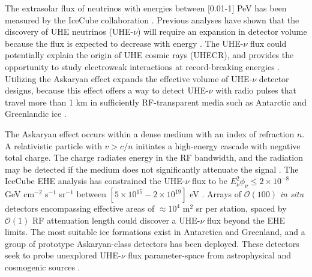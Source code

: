 \documentclass[amsmath,amssymb,aps,prd,10pt,twocolumn]{revtex4}
\begin{document}
The extrasolar flux of neutrinos with energies between [0.01-1] PeV has been measured by the IceCube collaboration \cite{10.1126/science.1242856}.  Previous analyses have shown that the discovery of UHE neutrinos (UHE-$\nu$) will require an expansion in detector volume because the flux is expected to decrease with energy \cite{10.1016/j.astropartphys.2010.06.003,10.1088/1475-7516/2010/10/013,10.1103/physrevd.98.062003,10.1088/1475-7516/2020/03/053,10.1103/physrevd.102.043021}.  The UHE-$\nu$ flux could potentially explain the origin of UHE cosmic rays (UHECR), and provides the opportunity to study electroweak interactions at record-breaking energies \cite{Ackermann:201946d,Ackermann:20195ec}.  Utilizing the Askaryan effect expands the effective volume of UHE-$\nu$ detector designs, because this effect offers a way to detect UHE-$\nu$ with radio pulses that travel more than 1 km in sufficiently RF-transparent media such as Antarctic and Greenlandic ice \cite{10.3189/2015jog14j214, 10.3189/2015jog15j057, 10.1016/j.astropartphys.2011.11.010}.

The Askaryan effect occurs within a dense medium with an index of refraction $n$.  A relativistic particle with $v > c/n$ initiates a high-energy cascade with negative total charge.  The charge radiates energy in the RF bandwidth, and the radiation may be detected if the medium does not significantly attenuate the signal \cite{askaryan1,zhs}.  The IceCube EHE analysis has constrained the UHE-$\nu$ flux to be $E_\nu^2 \phi_\nu \leq 2 \times 10^{-8}$ GeV cm$^{-2}$ s$^{-1}$ sr$^{-1}$ between $[5\times 10^{15} - 2\times 10^{19}]$ eV \cite{10.1103/physrevd.98.062003}.  Arrays of $\mathcal{O}(100)$ \textit{in situ} detectors encompassing effective areas of $\approx 10^4$ m$^2$ sr per station, spaced by $\mathcal{O}(1)$ RF attenuation length could discover a UHE-$\nu$ flux beyond the EHE limits.  The most suitable ice formations exist in Antarctica and Greenland, and a group of prototype Askaryan-class detectors has been deployed.  These detectors seek to probe unexplored UHE-$\nu$ flux parameter-space from astrophysical and cosmogenic sources \cite{10.1103/PhysRevD.85.062004,10.1088/1475-7516/2020/03/053,10.1103/physrevd.102.043021,10.1103/physrevd.99.122001}.
\end{document}
